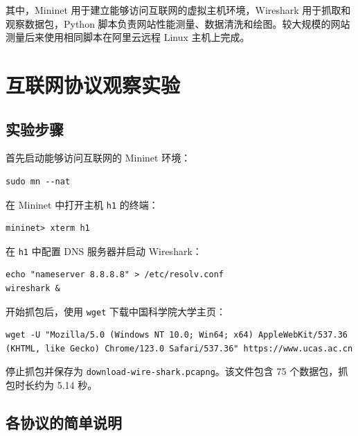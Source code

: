 \documentclass[UTF8,12pt,a4paper,fontset=fandol]{ctexart}
\begin{document}
其中，Mininet 用于建立能够访问互联网的虚拟主机环境，Wireshark 用于抓取和观察数据包，Python 脚本负责网站性能测量、数据清洗和绘图。较大规模的网站测量后来使用相同脚本在阿里云远程 Linux 主机上完成。

\section{互联网协议观察实验}

\subsection{实验步骤}

首先启动能够访问互联网的 Mininet 环境：

\begin{verbatim}
sudo mn --nat
\end{verbatim}

在 Mininet 中打开主机 \texttt{h1} 的终端：

\begin{verbatim}
mininet> xterm h1
\end{verbatim}

在 \texttt{h1} 中配置 DNS 服务器并启动 Wireshark：

\begin{verbatim}
echo "nameserver 8.8.8.8" > /etc/resolv.conf
wireshark &
\end{verbatim}

开始抓包后，使用 \texttt{wget} 下载中国科学院大学主页：

\begin{verbatim}
wget -U "Mozilla/5.0 (Windows NT 10.0; Win64; x64) AppleWebKit/537.36 (KHTML, like Gecko) Chrome/123.0 Safari/537.36" https://www.ucas.ac.cn
\end{verbatim}

停止抓包并保存为 \texttt{download-wire-shark.pcapng}。该文件包含 75 个数据包，抓包时长约为 5.14 秒。

\subsection{各协议的简单说明}
\end{document}
